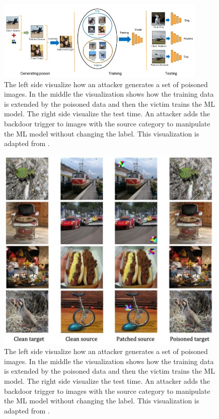 \begin{figure}[ht!]
  \centering
  \includegraphics[width=10cm]{pictures/procedure_hidden_trigger.jpg}
  \caption{The left side visualize how an attacker generates a set of poisoned images. In the middle the visualization shows how the training data is extended by the poisoned data and then the victim trains the ML model. The right side visualize the test time. An attacker adds the backdoor trigger to images with the source category to manipulate the ML model without changing the label. This visualization is adapted from \cite{DBLP:journals/corr/abs-1910-00033}.}
  \label{fig:procedure_hidden_trigger}
\end{figure}

\begin{figure}[ht!]
  \centering
  \includegraphics[width=11cm]{pictures/poisoned_hidden_trigger.jpg}
  \caption{The left side visualize how an attacker generates a set of poisoned images. In the middle the visualization shows how the training data is extended by the poisoned data and then the victim trains the ML model. The right side visualize the test time. An attacker adds the backdoor trigger to images with the source category to manipulate the ML model without changing the label. This visualization is adapted from \cite{DBLP:journals/corr/abs-1910-00033}.}
  \label{fig:poisoned_hidden_trigger}
\end{figure}

